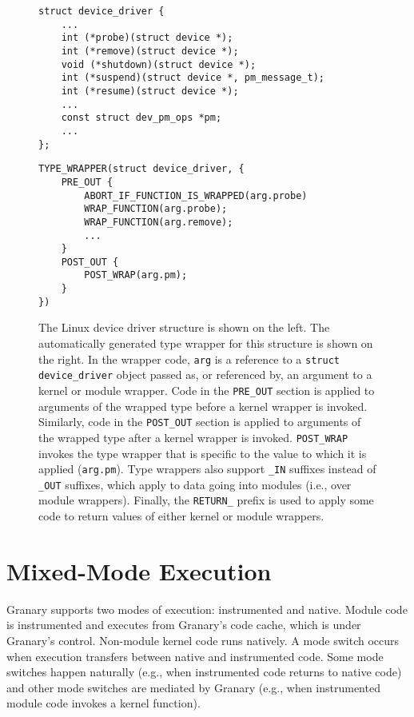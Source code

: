 \documentclass[preprint]{sigplanconf}
\begin{document}
\begin{figure*}[t!]
\lstset{language=C, tabsize=2, stepnumber=1}
\begin{multicols}{2}
\begin{lstlisting}[basicstyle=\footnotesize\ttfamily]
struct device_driver {
	...
	int (*probe)(struct device *);
	int (*remove)(struct device *);
	void (*shutdown)(struct device *);
	int (*suspend)(struct device *, pm_message_t);
	int (*resume)(struct device *);
	...
	const struct dev_pm_ops *pm;
	...
};
\end{lstlisting}
\columnbreak
\begin{lstlisting}[basicstyle=\footnotesize\ttfamily]
TYPE_WRAPPER(struct device_driver, {
    PRE_OUT {
        ABORT_IF_FUNCTION_IS_WRAPPED(arg.probe)
        WRAP_FUNCTION(arg.probe);
        WRAP_FUNCTION(arg.remove);
        ...
    }
    POST_OUT {
        POST_WRAP(arg.pm);
    }
})
\end{lstlisting}
\end{multicols}
\vspace{-1em}
\caption{The Linux device driver structure is shown on the left. The automatically generated type wrapper for this structure is shown on the right. In the wrapper code, \texttt{arg} is a reference to a \texttt{struct device\_driver} object passed as, or referenced by, an argument to a kernel or module wrapper. Code in the \texttt{PRE\_OUT} section is applied to arguments of the wrapped type before a kernel wrapper is invoked. Similarly, code in the \texttt{POST\_OUT} section is applied to arguments of the wrapped type after a kernel wrapper is invoked. \texttt{POST\_WRAP} invokes the type wrapper that is specific to the value to which it is applied (\texttt{arg.pm}). Type wrappers also support \texttt{\_IN} suffixes instead of \texttt{\_OUT} suffixes, which apply to data going into modules (i.e., over module wrappers). Finally, the \texttt{RETURN\_} prefix is used to apply some code to return values of either kernel or module wrappers.}
\label{fig:type_wrapper}
\end{figure*}

\section{Mixed-Mode Execution}\label{sec:modes}
Granary supports two modes of execution: instrumented and native. Module code is instrumented and executes from Granary's code cache, which is under Granary's control. Non-module kernel code runs natively. A mode switch occurs when execution transfers between native and instrumented code. Some mode switches happen naturally (e.g., when instrumented code returns to native code) and other mode switches are mediated by Granary (e.g., when instrumented module code invokes a kernel function).
\end{document}
